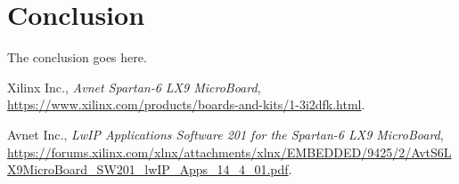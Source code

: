 \documentclass[conference,compsoc]{IEEEtran}
\begin{document}

\section{Conclusion}
The conclusion goes here.



%
%
%
\begin{thebibliography}{1}

		Xilinx Inc., \emph{Avnet Spartan-6 LX9 MicroBoard}, \url{https://www.xilinx.com/products/boards-and-kits/1-3i2dfk.html}.

		Avnet Inc., \emph{LwIP Applications Software 201 for the Spartan-6 LX9 MicroBoard}, \url{https://forums.xilinx.com/xlnx/attachments/xlnx/EMBEDDED/9425/2/AvtS6LX9MicroBoard_SW201_lwIP_Apps_14_4_01.pdf}.

\end{thebibliography}




\end{document}
